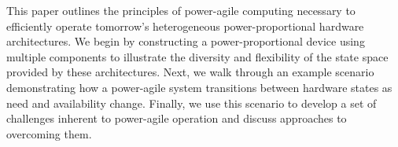 This paper outlines the principles of power-agile computing necessary to
efficiently operate tomorrow's heterogeneous power-proportional hardware
architectures. We begin by constructing a power-proportional device using
multiple components to illustrate the diversity and flexibility of the state
space provided by these architectures. Next, we walk through an example
scenario demonstrating how a power-agile system transitions between hardware
states as need and availability change. Finally, we use this scenario to
develop a set of challenges inherent to power-agile operation and discuss
approaches to overcoming them.
